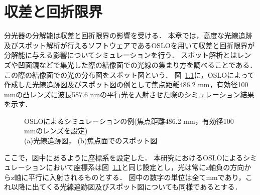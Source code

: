 \chapter{収差と回折限界}
\label{chap:basic_matters}
分光器の分解能は収差と回折限界の影響を受ける．
本章では，高度な光線追跡及びスポット解析が行えるソフトウェアであるOSLOを用いて収差と回折限界が分解能に与える影響についてシミュレーションを行う．
スポット解析とはレンズや凹面鏡などで集光した際の結像面での光線の集まり方を調べることである．
この際の結像面での光の分布図をスポット図という．
図\ \ref{fig:OSLO_spot_example}に，OSLOによって作成した光線追跡図及びスポット図の例として焦点距離486.2 mm，有効径100 mmの凸レンズに波長587.6 nmの平行光を入射させた際のシミュレーション結果を示す．
\begin{figure}
    \caption{OSLOによるシミュレーションの例(焦点距離486.2 mm，有効径100 mmのレンズを設定) \\
    \centering(a)光線追跡図，
    (b)焦点面でのスポット図}
    \label{fig:OSLO_spot_example}
\end{figure}
ここで，図中にあるように座標系を設定した．
本研究におけるOSLOによるシミュレーションにおいて座標系は図\ \ref{fig:OSLO_spot_example}と同じ設定とし，光は常にz軸負の方向からz軸に平行に入射されるものとする．
図中の数字の単位は全てmmであり，これ以降に出てくる光線追跡図及びスポット図についても同様であるとする．


